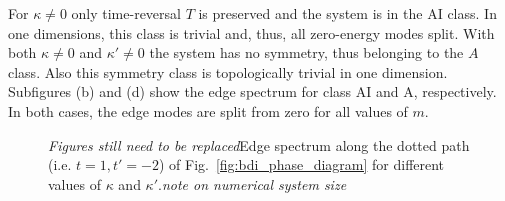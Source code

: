 \documentclass[twocolumn,amsmath,longbibliography,amssymb,superscriptaddress]{revtex4-1}
\newcommand{\mariac}[1]{{\it\color{cyan}#1}}
\begin{document}
For $\kappa \neq 0$ only time-reversal $T$ is preserved and the system is in the AI class. 
In one dimensions, this class is trivial and, thus,  all zero-energy modes split. 
With both $\kappa \neq 0$ and $\kappa' \neq0$ the system has no symmetry, thus belonging to the $A$ class.  
Also this symmetry class is topologically trivial in one dimension. 
Subfigures (b) and (d) show the edge spectrum for class AI and A, respectively. In both cases, the edge modes are split from zero for all values of $m$.


%

\begin{figure}[h!]
\centering

\hspace{0mm}

\caption{\mariac{Figures still need to be replaced}Edge spectrum along the dotted path (i.e. $t=1,t'=-2$) of Fig.~\ref{fig:bdi_phase_diagram} for different values of $\kappa$ and $\kappa'$.\mariac{note on numerical system size}}
\label{fig:zero_E_modes}
\end{figure}
\end{document}
